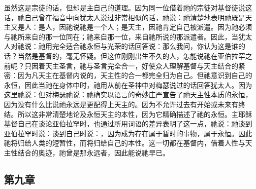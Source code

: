 虽然这是宗徒的话，但却是主自己的道理。因为同一位借着祂的宗徒对基督徒说这话，祂自己曾在福音中向犹太人说过非常相似的话，祂说：祂清楚地表明祂既是天主又是人：是人，因祂说祂是一个人；是天主，因祂肯定自己被派遣。因为祂必须与祂所来自的那一位同在；祂来自那一位，来自祂所说的那派遣者。因此，当犹太人对祂说：祂用完全适合祂永恒与光荣的话回答说：那么我问，你认为这是谁的话？当然是基督的，毫无怀疑。但这位刚刚出生不久的人，怎能说祂在亚伯拉罕之前呢？只因着天主圣言，祂与圣言完全合一，好使众人理解基督与天主结合的紧密：因为凡天主在基督内说的，天主性的合一都完全归为自己。但祂意识到自己的永恒，因此当祂在身体中时，祂用从前在圣神中对梅瑟说过的话回答犹太人。因为这里祂说：但对梅瑟祂说：祂确实以语言的奇妙庄严宣告了祂天主性本质的永恒，因为没有什么比说祂永远是更配得上天主的。因为不允许过去有开始或未来有终结。所以这非常清楚地论及永恒天主的本性，因为它精确描述了祂的永恒。主耶稣基督自己在谈论亚伯拉罕时，也通过所用词语的差异表明了这一点，祂说：祂谈到亚伯拉罕时说：谈到自己时说：，因为成为存在属于暂时的事物，属于永恒。因此祂将归给人类的短暂性，而将归给自己的本性。这一切都在基督内，借着人性与天主性结合的奥迹，祂曾是那永远者，因此能说祂早已。\par


\subsection{第九章}

\par

